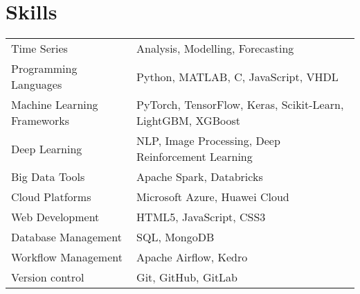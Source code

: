 \documentclass[a4paper,10pt]{article}
\begin{document}
\section{Skills}
\begin{tabularx}{\linewidth}{@{}l X@{}}
Time Series & Analysis, Modelling, Forecasting\\
Programming Languages & Python, MATLAB, C, JavaScript, VHDL\\
Machine Learning Frameworks & PyTorch, TensorFlow, Keras, Scikit-Learn, LightGBM, XGBoost\\
Deep Learning & NLP, Image Processing, Deep Reinforcement Learning\\
Big Data Tools & Apache Spark, Databricks\\
Cloud Platforms & Microsoft Azure, Huawei Cloud\\
Web Development & HTML5, JavaScript, CSS3\\
Database Management & SQL, MongoDB\\
Workflow Management & Apache Airflow, Kedro\\
Version control & Git, GitHub, GitLab\\
\end{tabularx}





\vfill
{}
\end{document}
